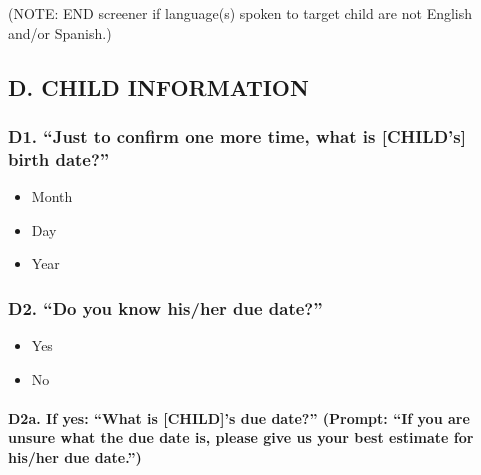 \documentclass[
  12pt,
]{book}
\providecommand{\tightlist}{%
  \setlength{\itemsep}{0pt}\setlength{\parskip}{0pt}}
\begin{document}
(NOTE: END screener if language(s) spoken to target child are not English and/or Spanish.)

\hypertarget{d.-child-information}{%
\subsection*{D. CHILD INFORMATION}\label{d.-child-information}}

\hypertarget{d1.-just-to-confirm-one-more-time-what-is-childs-birth-date}{%
\subsubsection*{D1. ``Just to confirm one more time, what is {[}CHILD's{]} birth date?''}\label{d1.-just-to-confirm-one-more-time-what-is-childs-birth-date}}

\begin{itemize}
\tightlist
\item
  Month
\item
  Day
\item
  Year
\end{itemize}

\hypertarget{d2.-do-you-know-hisher-due-date}{%
\subsubsection*{D2. ``Do you know his/her due date?''}\label{d2.-do-you-know-hisher-due-date}}

\begin{itemize}
\tightlist
\item
  Yes
\item
  No
\end{itemize}

\hypertarget{d2a.-if-yes-what-is-childs-due-date-prompt-if-you-are-unsure-what-the-due-date-is-please-give-us-your-best-estimate-for-hisher-due-date.}{%
\paragraph*{D2a. If yes: ``What is {[}CHILD{]}'s due date?'' (Prompt: ``If you are unsure what the due date is, please give us your best estimate for his/her due date.'')}\label{d2a.-if-yes-what-is-childs-due-date-prompt-if-you-are-unsure-what-the-due-date-is-please-give-us-your-best-estimate-for-hisher-due-date.}}
\end{document}
